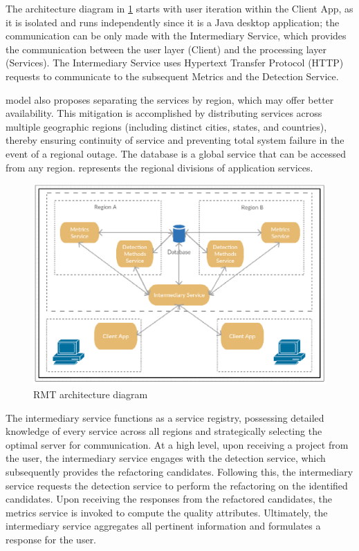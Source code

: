 The architecture diagram in \cref{fig-architecture} starts with user iteration within the Client App, as it is isolated and runs independently since it is a Java desktop application; the communication can be only made with the Intermediary Service, which provides the communication between the user layer (Client) and the processing layer (Services). The Intermediary Service uses Hypertext Transfer Protocol (HTTP) requests to communicate to the subsequent Metrics and the Detection Service.

\textcite{beluzzo2018abordagem} model also proposes separating the services by region, which may offer better availability. This mitigation is accomplished by distributing services across multiple geographic regions (including distinct cities, states, and countries), thereby ensuring continuity of service and preventing total system failure in the event of a regional outage. The database is a global service that can be accessed from any region.  represents the regional divisions of application services.

\begin{figure}[ht!]
\SetCaptionWidth{\textwidth}
\caption{RMT architecture diagram}
\label{fig-architecture}
\includegraphics[width =\textwidth]{Chapter-2/Figures/schema.png}
\end{figure}
\FloatBarrier

The intermediary service functions as a service registry, possessing detailed knowledge of every service across all regions and strategically selecting the optimal server for communication. At a high level, upon receiving a project from the user, the intermediary service engages with the detection service, which subsequently provides the refactoring candidates. Following this, the intermediary service requests the detection service to perform the refactoring on the identified candidates. Upon receiving the responses from the refactored candidates, the metrics service is invoked to compute the quality attributes. Ultimately, the intermediary service aggregates all pertinent information and formulates a response for the user.

